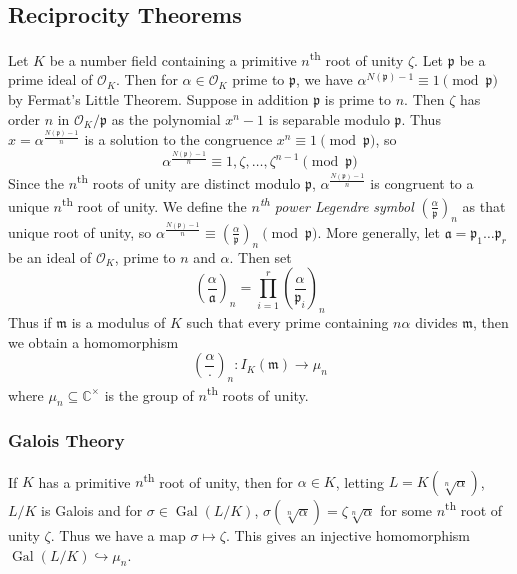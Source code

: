 \documentclass[11pt]{article}
\theoremstyle{definition}
\theoremstyle{plain}
\theoremstyle{remark}
\DeclareMathOperator{\Gal}{Gal}
\newcommand{\CC}{\mathbb{C}}
\newcommand{\cO}{\mathcal{O}}
\newcommand{\fa}{\mathfrak{a}}
\newcommand{\fp}{\mathfrak{p}}
\newcommand{\fm}{\mathfrak{m}}
\newcommand{\leg}[2]{\left(\frac{#1}{#2}\right)}
\begin{document}
\subsection{Reciprocity Theorems}

Let $K$ be a number field containing a primitive $n$\textsuperscript{th} root of unity $\zeta$. Let $\fp$ be a prime ideal of $\cO_K$. Then for $\alpha \in \cO_K$ prime to $\fp$, we have $\alpha^{N(\fp) - 1} \equiv 1 \pmod{\fp}$ by Fermat's Little Theorem. Suppose in addition $\fp$ is prime to $n$. Then $\zeta$ has order $n$ in $\cO_K / \fp$ {\color{blue} as the polynomial $x^n - 1$ is separable modulo $\fp$}. Thus $x = \alpha^{\frac{N(\fp)-1}{n}}$ is a solution to the congruence $x^n \equiv 1 \pmod{\fp}$, so
\begin{equation*}
    \alpha^{\frac{N(\fp)-1}{n}} \equiv 1, \zeta, \ldots, \zeta^{n-1} \pmod{\fp}
\end{equation*}
Since the $n$\textsuperscript{th} roots of unity are distinct modulo $\fp$, $\alpha^{\frac{N(\fp)-1}{n}}$ is congruent to a unique $n$\textsuperscript{th} root of unity. We define the \emph{$n$\textsuperscript{th} power Legendre symbol} $\leg{\alpha}{\fp}_n$ as that unique root of unity, so $\alpha^{\frac{N(\fp)-1}{n}} \equiv \leg{\alpha}{\fp}_n \pmod{\fp}$. More generally, let $\fa = \fp_1 \ldots \fp_r$ be an ideal of $\cO_K$, prime to $n$ and $\alpha$. Then set
\begin{equation*}
    \leg{\alpha}{\fa}_n = \prod_{i=1}^r \leg{\alpha}{\fp_i}_n
\end{equation*}
Thus if $\fm$ is a modulus of $K$ such that every prime containing $n\alpha$ divides $\fm$, then we obtain a homomorphism
\begin{equation*}
    \leg{\alpha}{\cdot}_n : I_K(\fm) \to \mu_n
\end{equation*}
where $\mu_n \subseteq \CC^\times$ is the group of $n$\textsuperscript{th} roots of unity.

\subsubsection*{Galois Theory}
If $K$ has a primitive $n$\textsuperscript{th} root of unity, then for $\alpha \in K$, letting $L = K(\sqrt[n]{\alpha})$, $L/K$ is Galois and for $\sigma \in \Gal(L/K)$, $\sigma(\sqrt[n]{\alpha}) = \zeta \sqrt[n]{\alpha}$ for some $n$\textsuperscript{th} root of unity $\zeta$. Thus we have a map $\sigma \mapsto \zeta$. This gives an injective homomorphism $\Gal(L/K) \hookrightarrow \mu_n$.
\end{document}
